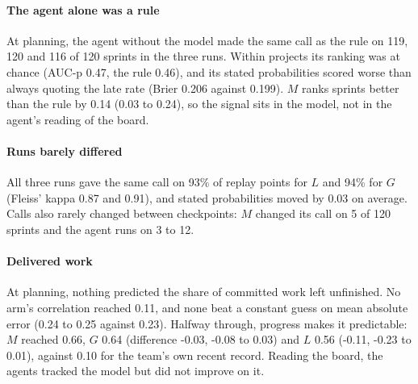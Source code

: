 \documentclass[conference]{IEEEtran}
\begin{document}
\paragraph{The agent alone was a rule} At planning, the agent without the model made the same call as the rule on 119, 120 and 116 of 120 sprints in the three runs. Within projects its ranking was at chance (AUC-p 0.47, the rule 0.46), and its stated probabilities scored worse than always quoting the late rate (Brier 0.206 against 0.199). $M$ ranks sprints better than the rule by 0.14 (0.03 to 0.24), so the signal sits in the model, not in the agent's reading of the board.

\paragraph{Runs barely differed} All three runs gave the same call on 93\% of replay points for $L$ and 94\% for $G$ (Fleiss' kappa 0.87 and 0.91), and stated probabilities moved by 0.03 on average. Calls also rarely changed between checkpoints: $M$ changed its call on 5 of 120 sprints and the agent runs on 3 to 12.

\paragraph{Delivered work} At planning, nothing predicted the share of committed work left unfinished. No arm's correlation reached 0.11, and none beat a constant guess on mean absolute error (0.24 to 0.25 against 0.23). Halfway through, progress makes it predictable: $M$ reached 0.66, $G$ 0.64 (difference -0.03, -0.08 to 0.03) and $L$ 0.56 (-0.11, -0.23 to 0.01), against 0.10 for the team's own recent record. Reading the board, the agents tracked the model but did not improve on it.
\end{document}

